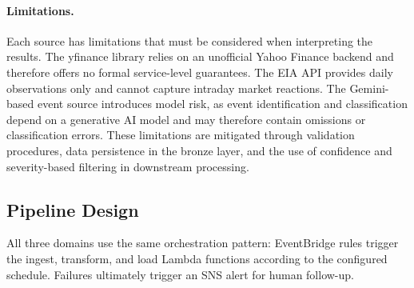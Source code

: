 \documentclass[11pt,a4paper]{article}
\begin{document}
\paragraph{Limitations.}
Each source has limitations that must be considered when interpreting
the results. The yfinance library relies on an unofficial Yahoo Finance
backend and therefore offers no formal service-level guarantees. The
EIA API provides daily observations only and cannot capture intraday
market reactions. The Gemini-based event source introduces model risk,
as event identification and classification depend on a generative AI
model and may therefore contain omissions or classification errors.
These limitations are mitigated through validation procedures, data
persistence in the bronze layer, and the use of confidence and
severity-based filtering in downstream processing.

\subsection{Pipeline Design}
\label{sec:pipeline_design}

All three domains use the same orchestration pattern: EventBridge
rules trigger the ingest, transform, and load Lambda functions
according to the configured schedule. Failures ultimately trigger an SNS alert for human follow-up.
\end{document}
